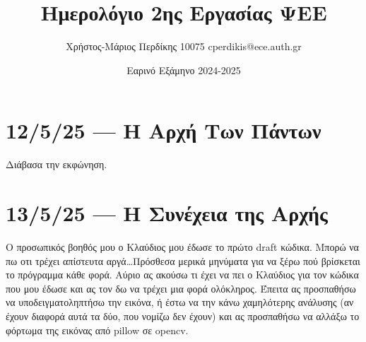 \documentclass{article}
\title{Ημερολόγιο 2ης Εργασίας ΨΕΕ}
\date{Εαρινό Εξάμηνο 2024-2025}
\author{Χρήστος-Μάριος Περδίκης 10075 cperdikis@ece.auth.gr}
\begin{document}
\maketitle

\section{12/5/25 --- Η Αρχή Των Πάντων}
Διάβασα την εκφώνηση.

\section{13/5/25 --- Η Συνέχεια της Αρχής}
Ο προσωπικός βοηθός μου ο Κλαύδιος μου έδωσε το πρώτο draft κώδικα.
Μπορώ να πω οτι τρέχει απίστευτα αργά\ldots Πρόσθεσα μερικά μηνύματα για
να ξέρω πού βρίσκεται το πρόγραμμα κάθε φορά. Αύριο ας ακούσω τι έχει να πει ο
Κλαύδιος για τον κώδικα που μου έδωσε και ας τον δω να τρέχει μια φορά 
ολόκληρος. Έπειτα ας προσπαθήσω να υποδειγματοληπτήσω την εικόνα, ή έστω
να την κάνω χαμηλότερης ανάλυσης (αν έχουν διαφορά αυτά τα δύο, που
νομίζω δεν έχουν) και ας προσπαθήσω να αλλάξω το φόρτωμα της εικόνας
από pillow σε opencv.
\end{document}
